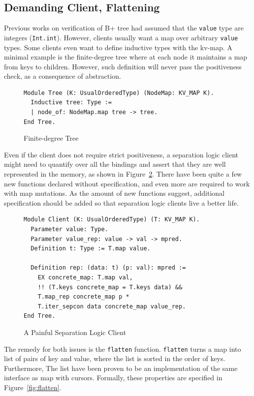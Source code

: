 \documentclass[runningheads]{llncs}
\begin{document}
\subsection{Demanding Client, Flattening}

Previous works on verification of B+ tree had assumed that the \texttt{value}
type are integers (\texttt{Int.int}). However, clients usually want a map over
arbitrary \texttt{value} types. Some clients even want to define inductive types
with the kv-map. A minimal example is the finite-degree tree where at each node
it maintains a map from keys to children. However, such definition will never
pass the positiveness check, as a consequence of abstraction.

\begin{figure}[htbp]
  \centering
\begin{verbatim}
Module Tree (K: UsualOrderedType) (NodeMap: KV_MAP K).
  Inductive tree: Type :=
  | node_of: NodeMap.map tree -> tree.
End Tree.
\end{verbatim}
  \caption{Finite-degree Tree}\label{fig:inductive}
\end{figure}

Even if the client does not require strict positiveness, a separation logic
client might need to quantify over all the bindings and assert that they are
well represented in the memory, as shown in Figure~\ref{fig:rep}. There have
been quite a few new functions declared without specification, and even more are
required to work with map mutations. As the amount of new functions suggest,
additional specification should be added so that separation logic clients live a
better life. 

\begin{figure}[htbp]
  \centering
\begin{verbatim}
Module Client (K: UsualOrderedType) (T: KV_MAP K).
  Parameter value: Type.
  Parameter value_rep: value -> val -> mpred.
  Definition t: Type := T.map value.

  Definition rep: (data: t) (p: val): mpred :=
    EX concrete_map: T.map val,
    !! (T.keys concrete_map = T.keys data) &&
    T.map_rep concrete_map p *
    T.iter_sepcon data concrete_map value_rep.
End Tree.
\end{verbatim}
  \caption{A Painful Separation Logic Client}\label{fig:rep}
\end{figure}

The remedy for both issues is the \texttt{flatten} function. \texttt{flatten}
turns a map into list of pairs of key and value, where the list is sorted in
the order of keys. Furthermore, The list have been proven to be an
implementation of the same interface as map with cursors. Formally, these
properties are specified in Figure~\ref{fig:flatten}.
\end{document}
